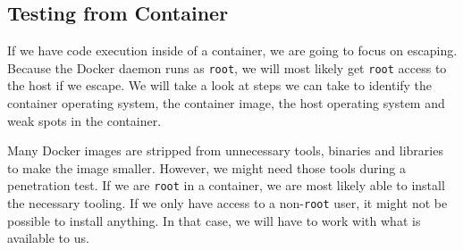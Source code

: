 \subsection{Testing from Container}
If we have code execution inside of a container, we are going to focus on escaping. Because the Docker daemon runs as \lstinline{root}, we will most likely get \lstinline{root} access to the host if we escape. We will take a look at steps we can take to identify the container operating system, the container image, the host operating system and weak spots in the container.

\hfill

Many Docker images are stripped from unnecessary tools, binaries and libraries to make the image smaller. However, we might need those tools during a penetration test. If we are \lstinline{root} in a container, we are most likely able to install the necessary tooling. If we only have access to a non-\lstinline{root} user, it might not be possible to install anything. In that case, we will have to work with what is available to us.








